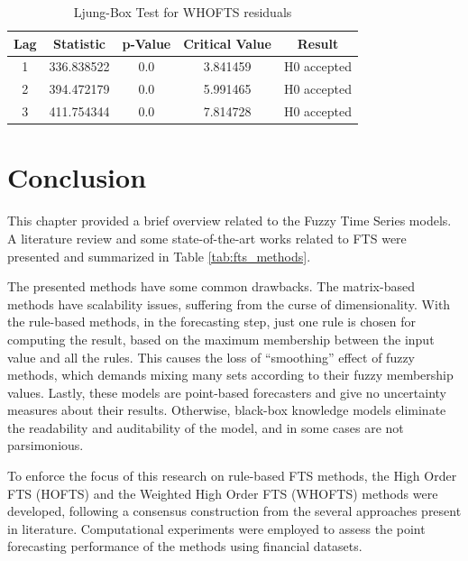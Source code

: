 \begin{table}[htb]
    \centering
    \begin{tabular}{|c|c|c|c|c|}
\hline
Lag &   Statistic &  p-Value &  Critical Value &       Result \\ \hline
1 &  336.838522 &      0.0 &        3.841459 &  H0 accepted \\ \hline
2 &  394.472179 &      0.0 &        5.991465 &  H0 accepted \\ \hline
3 &  411.754344 &      0.0 &        7.814728 &  H0 accepted \\ \hline
\end{tabular}
    \caption{Ljung-Box Test for WHOFTS residuals}
    \label{tab:whofts_residuals}
\end{table}

\section{Conclusion} 

This chapter provided a brief overview related to the Fuzzy Time Series models. A literature review and some state-of-the-art works related to FTS were presented and summarized in Table \ref{tab:fts_methods}.

The presented methods have some common drawbacks. The matrix-based methods have scalability issues, suffering from the curse of dimensionality. With the rule-based methods, in the forecasting step, just one rule is chosen for computing the result, based on the maximum membership between the input value and all the rules. This causes the loss of ``smoothing'' effect of fuzzy methods, which demands mixing many sets according to their fuzzy membership values. Lastly, these models are point-based forecasters and give no uncertainty measures about their results.  Otherwise, black-box knowledge models eliminate the readability and auditability of the model, and in some cases are not parsimonious. 

To enforce the focus of this research on rule-based FTS methods,  the High Order FTS (HOFTS) and the Weighted High Order FTS (WHOFTS) methods were developed, following a consensus construction from the several approaches present in literature. Computational experiments were employed to assess the point forecasting performance of the methods using financial datasets.


